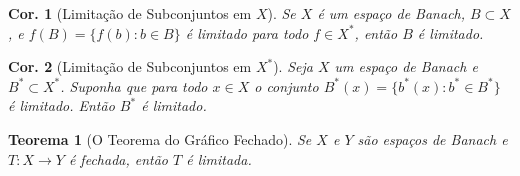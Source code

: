 \documentclass[11pt]{article}
\theoremstyle{yellowhead}
\newtheorem*{theorem}{Teorema}
\newtheorem*{corollary}{Cor.}
\theoremstyle{yellowdef}
\begin{document}
\begin{multicols}{3}
\begin{corollary}[Limitação de Subconjuntos em $X$]
Se $X$ é um espaço de Banach, $B \subset X$, e $f(B) = \{f(b): b \in B\}$ é limitado para todo $f \in X^*$, então $B$ é limitado.
\end{corollary}

\begin{corollary}[Limitação de Subconjuntos em $X^*$]
Seja $X$ um espaço de Banach e $B^* \subset X^*$. Suponha que para todo $x \in X$ o conjunto $B^*(x) = \{b^*(x): b^* \in B^*\}$ é limitado. Então $B^*$ é limitado.
\end{corollary}

\begin{theorem}[O Teorema do Gráfico Fechado]
Se $X$ e $Y$ são espaços de Banach e $T: X \to Y$ é fechada, então $T$ é limitada.
\end{theorem}
\end{multicols}
\newpage
\end{document}
